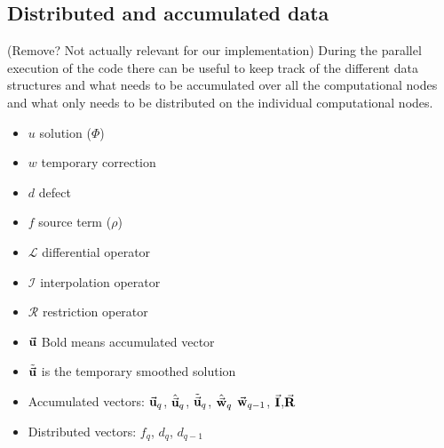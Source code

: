 	\subsection{Distributed and accumulated data}
		(Remove? Not actually relevant for our implementation)
		During the parallel execution of the code there can be useful to keep track
		of the different data structures and what needs to be accumulated over all
		the computational nodes and what only needs to be distributed on the individual computational nodes.

		\begin{itemize}
			\item \(u\) solution (\(\Phi\))
			\item \(w\) temporary correction
			\item \(d\) defect
			\item \(f\) source term (\(\rho\))
			\item \(\mathcal{L}\) differential operator
			\item \(\mathcal{I}\) interpolation operator
			\item \(\mathcal{R}\) restriction operator
			\item \( \va{u}\) Bold means accumulated vector
			\item \( \tilde{\va{ u }} \) is the temporary smoothed solution
		\end{itemize}

		\begin{itemize}
			\item Accumulated vectors:	\(\va{u}_q\), \( \hat{\va{u}}_q \), \(\tilde{\va{u}}_q\), \(\hat{\va{w}}_q\) \(\va{w}_{q-1}\), \(\va{I}\),\(\va{R}\)
			\item Distributed vectors:  \( f_q \), \(d_q\), \(d_{q-1}\)
		\end{itemize}



